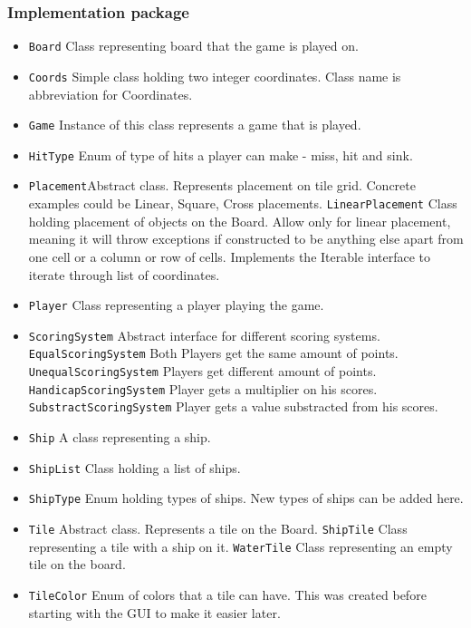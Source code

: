 \documentclass[]{article}
\begin{document}
\subsubsection{Implementation package}
\begin{itemize}
	\item \texttt{Board} Class representing board that the game is played on.
	\item \texttt{Coords} Simple class holding two integer coordinates. Class name is abbreviation for Coordinates.
	\item \texttt{Game} Instance of this class represents a game that is played.
	\item \texttt{HitType} Enum of type of hits a player can make - miss, hit and sink.
	\item \texttt{Placement}Abstract class. Represents placement on tile grid. Concrete examples could be Linear, Square, Cross placements.
	\subitem \texttt{LinearPlacement} Class holding placement of objects on the Board. Allow only for linear placement, meaning it will throw exceptions if constructed to be anything else apart from one cell or a column or row of cells. Implements the Iterable interface to iterate through list of coordinates.
	\item \texttt{Player} Class representing a player playing the game.
	\item \texttt{ScoringSystem} Abstract interface for different scoring systems.
	\subitem \texttt{EqualScoringSystem} Both Players get the same amount of points.
	\subitem \texttt{UnequalScoringSystem} Players get different amount of points.
	\subsubitem \texttt{HandicapScoringSystem} Player gets a multiplier on his scores.
	\subsubitem \texttt{SubstractScoringSystem} Player gets a value substracted from his scores.
	\item \texttt{Ship} A class representing a ship.
	\item \texttt{ShipList} Class holding a list of ships.
	\item \texttt{ShipType} Enum holding types of ships. New types of ships can be added here.
	\item \texttt{Tile} Abstract class. Represents a tile on the Board.
	\subitem \texttt{ShipTile} Class representing a tile with a ship on it.
	\subitem \texttt{WaterTile} Class representing an empty tile on the board.
	\item \texttt{TileColor} Enum of colors that a tile can have. This was created before starting with the GUI to make it easier later.
\end{itemize}
\end{document}
